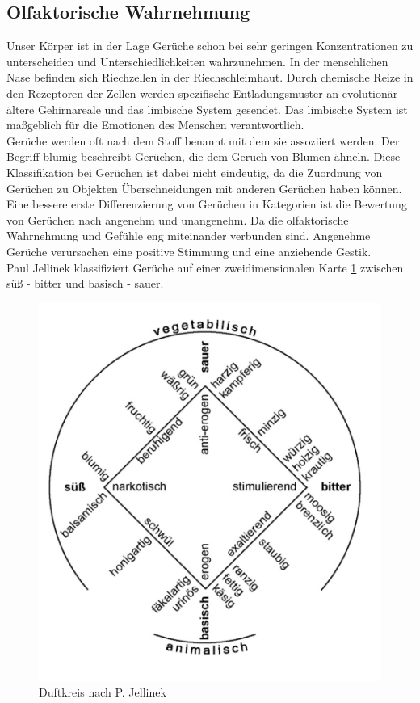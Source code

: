 \subsection{Olfaktorische Wahrnehmung}
Unser Körper ist in der Lage Gerüche schon bei sehr geringen Konzentrationen zu unterscheiden und Unterschiedlichkeiten wahrzunehmen. In der menschlichen Nase befinden sich Riechzellen in der Riechschleimhaut. Durch chemische Reize in den Rezeptoren der Zellen werden spezifische Entladungsmuster an evolutionär ältere Gehirnareale und das limbische System gesendet. Das limbische System ist maßgeblich für die Emotionen des Menschen verantwortlich. \cite[Vgl. Seite 102]{Schonhammer.2013}\\
Gerüche werden oft nach dem Stoff benannt mit dem sie assoziiert werden. Der Begriff \glqq blumig\grqq{} beschreibt Gerüchen, die dem Geruch von Blumen ähneln. Diese Klassifikation bei Gerüchen ist dabei nicht eindeutig, da die Zuordnung von Gerüchen zu Objekten Überschneidungen mit anderen Gerüchen haben können. Eine bessere erste Differenzierung von Gerüchen in Kategorien ist die Bewertung von Gerüchen nach angenehm und unangenehm. Da die olfaktorische Wahrnehmung und Gefühle eng miteinander verbunden sind. Angenehme Gerüche verursachen eine positive Stimmung und eine anziehende Gestik. \cite[Vgl. Seite 105 f.]{Schonhammer.2013}\\
Paul Jellinek klassifiziert Gerüche auf einer zweidimensionalen Karte \ref{fig:Duft} zwischen süß - bitter und basisch - sauer. \cite[Vgl. Seite 104]{Schonhammer.2013} \\
\begin{figure}[hbt]
	\centering
	\includegraphics[width=0.5\linewidth]{images/Duft}
	\caption[Duftkreis nach P. Jellinek]{Duftkreis nach P. Jellinek \cite[Seite 105]{Schonhammer.2013}}
	\label{fig:Duft}
\end{figure}
